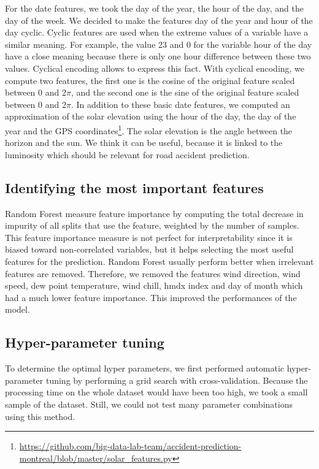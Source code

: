 \documentclass[conference]{IEEEtran}
\begin{document}
For the date features, we took the day of the year, the hour of the day,
and the day of the week. We decided to make the features day of the year
and hour of the day cyclic. Cyclic features are used when the extreme values
of a variable have a similar meaning. For example, the value 23 and 0 for
the variable hour of the day have a close meaning because there is only one
hour difference between these two values. Cyclical encoding allows to express
this fact. With cyclical encoding, we compute two features, the first one is
the cosine of the original feature scaled between 0 and 2$\pi$, and the second
one is the sine of the original feature scaled between 0 and 2$\pi$.
In addition to these basic date features, we computed an approximation
of the solar elevation using the hour of the day, the day of the year
and the GPS coordinates\footnote{\url{https://github.com/big-data-lab-team/accident-prediction-montreal/blob/master/solar\_features.py}}. The solar elevation is the angle 
between the horizon and the sun. We think it can be useful, because it is
linked to the luminosity which should be relevant for road accident prediction.

\subsection{Identifying the most important features}

Random Forest measure feature importance by computing the total
decrease in impurity of all splits that use the feature, weighted by the
number of samples. This feature importance measure is not perfect for
interpretability since it is biased toward non-correlated variables, but it
helps selecting the most useful features for the prediction. 
Random Forest usually perform better when irrelevant features are removed.
Therefore, we removed the features wind direction, wind speed, dew
point temperature, wind chill, hmdx index and day of month which had a
much lower feature importance. This improved the performances of the model.

\subsection{Hyper-parameter tuning}

To determine the optimal hyper parameters, we first performed
automatic hyper-parameter tuning by performing a grid search 
with cross-validation. Because the processing time on the whole dataset would
have been too high, we took a small sample of the dataset. Still, we could
not test many parameter combinations using this method.
\end{document}
